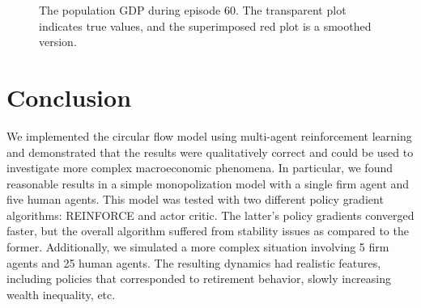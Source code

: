 \documentclass[twoside,twocolumn]{article}
\begin{document}
\begin{figure}[h]
  \caption{The population GDP during episode 60. The transparent plot indicates true values, and the superimposed red plot is a smoothed version.}
  \label{plt:late-gdp}
\end{figure}


\section{Conclusion}

We implemented the circular flow model using multi-agent reinforcement learning and demonstrated that the results were qualitatively correct and could be used to investigate more complex macroeconomic phenomena. In particular, we found reasonable results in a simple monopolization model with a single firm agent and five human agents. This model was tested with two different policy gradient algorithms: REINFORCE and actor critic. The latter's policy gradients converged faster, but the overall algorithm suffered from stability issues as compared to the former. Additionally, we simulated a more complex situation involving 5 firm agents and 25 human agents. The resulting dynamics had realistic features, including policies that corresponded to retirement behavior, slowly increasing wealth inequality, etc.

\medskip 
\end{document}
